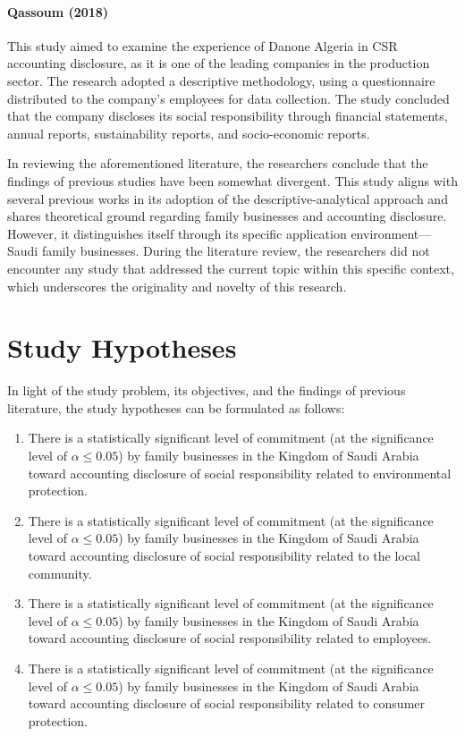\documentclass[10pt]{NSP1}
\begin{document}
\paragraph{Qassoum (2018) \cite{Qassoum2018}} This study aimed to examine the experience of Danone Algeria in CSR accounting disclosure, as it is one of the leading companies in the production sector. The research adopted a descriptive methodology, using a questionnaire distributed to the company's employees for data collection. The study concluded that the company discloses its social responsibility through financial statements, annual reports, sustainability reports, and socio-economic reports.

In reviewing the aforementioned literature, the researchers conclude that the findings of previous studies have been somewhat divergent. This study aligns with several previous works in its adoption of the descriptive-analytical approach and shares theoretical ground regarding family businesses and accounting disclosure. However, it distinguishes itself through its specific application environment—Saudi family businesses. During the literature review, the researchers did not encounter any study that addressed the current topic within this specific context, which underscores the originality and novelty of this research.

\section{Study Hypotheses}

In light of the study problem, its objectives, and the findings of previous literature, the study hypotheses can be formulated as follows:

\begin{enumerate}
    \item There is a statistically significant level of commitment (at the significance level of $\alpha \leq 0.05$) by family businesses in the Kingdom of Saudi Arabia toward accounting disclosure of social responsibility related to environmental protection.
    \item There is a statistically significant level of commitment (at the significance level of $\alpha \leq 0.05$) by family businesses in the Kingdom of Saudi Arabia toward accounting disclosure of social responsibility related to the local community.
    \item There is a statistically significant level of commitment (at the significance level of $\alpha \leq 0.05$) by family businesses in the Kingdom of Saudi Arabia toward accounting disclosure of social responsibility related to employees.
    \item There is a statistically significant level of commitment (at the significance level of $\alpha \leq 0.05$) by family businesses in the Kingdom of Saudi Arabia toward accounting disclosure of social responsibility related to consumer protection.
\end{enumerate}
\end{document}
